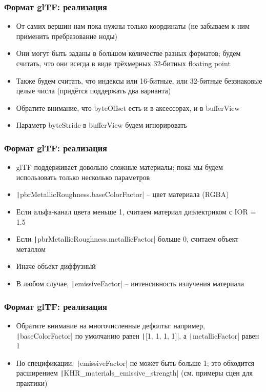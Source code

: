 \documentclass[10pt]{beamer}
\begin{document}
\begin{frame}
\frametitle{Формат glTF: реализация}
\begin{itemize}
\item От самих вершин нам пока нужны только координаты (не забываем к ним применить пребразование ноды)
\pause
\item Они могут быть заданы в большом количестве разных форматов; будем считать, что они всегда в виде трёхмерных 32-битных floating point
\pause
\item Также будем считать, что индексы или 16-битные, или 32-битные беззнаковые целые числа (придётся поддержать два варианта)
\pause
\item Обратите внимание, что byteOffset есть и в аксессорах, и в bufferView
\pause
\item Параметр byteStride в bufferView будем игнорировать
\end{itemize}
\end{frame}

\begin{frame}
\frametitle{Формат glTF: реализация}
\begin{itemize}
\item glTF поддерживает довольно сложные материалы; пока мы будем использовать только несколько параметров
\pause
\item \texttt|pbrMetallicRoughness.baseColorFactor| -- цвет материала (RGBA)
\pause
\item Если альфа-канал цвета меньше 1, считаем материал диэлектриком с IOR = 1.5
\pause
\item Если \texttt|pbrMetallicRoughness.metallicFactor| больше 0, считаем объект металлом
\pause
\item Иначе объект диффузный
\pause
\item В любом случае, \texttt|emissiveFactor| -- интенсивность излучения материала
\end{itemize}
\end{frame}

\begin{frame}
\frametitle{Формат glTF: реализация}
\begin{itemize}
\item Обратите внимание на многочисленные дефолты: например, \texttt|baseColorFactor| по умолчанию равен \texttt|[1, 1, 1, 1]|, а \texttt|metallicFactor| равен 1
\pause
\item По спецификации, \texttt|emissiveFactor| не может быть больше 1; это обходится расширением \texttt|KHR_materials_emissive_strength| (см. примеры сцен для практики)
\end{itemize}
\end{frame}
\end{document}
